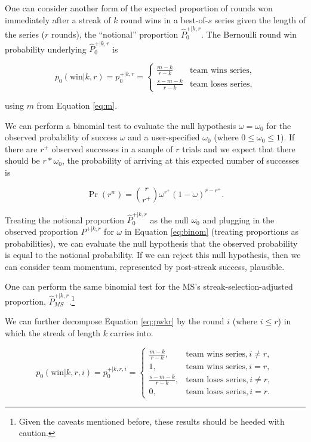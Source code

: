 \documentclass{article}
\begin{document}
One can consider another form of the expected proportion of rounds won
immediately after a streak of \(k\) round wins in a best-of-\(s\) series
given the length of the series (\(r\) rounds), the ``notional''
proportion \(\hat{P}^{+|k,r}_0\). The Bernoulli round win probability
underlying \(\hat{P}^{+|k,r}_0\) is

\begin{equation}\label{eq:pwkr}
p_0(\text{win} | k, r) = p^{+|k,r}_0 = \begin{cases}
\frac{m - k}{r - k} & \text{team wins series}, \\
\frac{s - m - k}{r - k} & \text{team loses series},
\end{cases}
\end{equation}

using \(m\) from Equation \ref{eq:m}.

We can perform a binomial test to evaluate the null hypothesis
\(\omega = \omega_0\) for the observed probability of success \(\omega\)
and a user-specified \(\omega_0\) (where \(0 \leq \omega_0 \leq 1\)). If
there are \(r^+\) observed successes in a sample of \(r\) trials and we
expect that there should be \(r * \omega_0\), the probability of
arriving at this expected number of successes is

\begin{equation}\label{eq:binom}
\Pr(r^w) = {\binom {r}{r^+}} \omega^{r^+}(1-\omega)^{r-r^+}.
\end{equation}

Treating the notional proportion \(\hat{P}^{+|k,r}_0\) as the null
\(\omega_0\) and plugging in the observed proportion \(P^{+|k,r}\) for
\(\omega\) in Equation \ref{eq:binom} (treating proportions as
probabilities), we can evaluate the null hypothesis that the observed
probability is equal to the notional probability. If we can reject this
null hypothesis, then we can consider team momentum, represented by
post-streak success, plausible.

One can perform the same binomial test for the MS's
streak-selection-adjusted proportion,
\(\hat{P}^{+|k,r}_{MS}\).\footnote{Given the caveats mentioned before,
  these results should be heeded with caution.}

We can further decompose Equation \ref{eq:pwkr} by the round \(i\)
(where \(i \leq r\)) in which the streak of length \(k\) carries into.

\begin{equation}\label{eq:pwkri}
p_0(\text{win} | k, r, i) = p^{+|k,r,i}_0 = \begin{cases}
\frac{m - k}{r - k}, & \text{team wins series}, i \neq r, \\
1, & \text{team wins series}, i = r, \\
\frac{s - m - k}{r - k}, & \text{team loses series}, i \neq r, \\
0, & \text{team loses series}, i = r.
\end{cases}
\end{equation}
\end{document}
